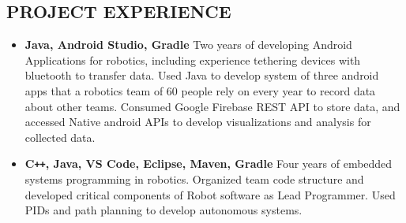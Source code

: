 \documentclass[overlapped]{res}
\begin{document}
\begin{resume}
    \section{PROJECT EXPERIENCE}

    \begin{itemize}[label={}]  \itemsep -2pt %
        \item \textbf{Java, Android Studio, Gradle}
              Two years of developing Android Applications for robotics, including experience tethering devices with bluetooth to transfer data.
            Used Java to develop system of three android apps that a robotics team of 60 people rely on every year to record data about other teams.
             Consumed Google Firebase REST API to store data, and accessed Native android APIs to develop visualizations and analysis for collected data.
        \item \textbf{C\texttt{++}, Java, VS Code, Eclipse, Maven, Gradle}
              Four years of embedded systems programming in robotics. Organized team code structure and developed critical components of Robot software as Lead Programmer.
              Used PIDs and path planning to develop autonomous systems.
    \end{itemize}


\end{resume}
\end{document}

